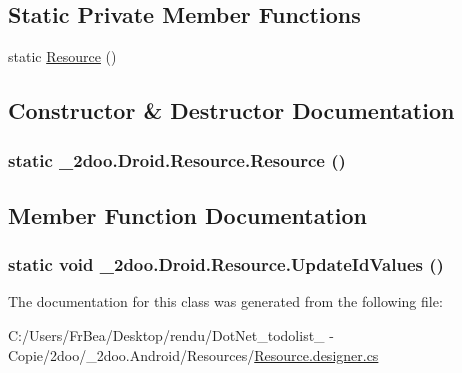 \subsection*{Static Private Member Functions}
\begin{CompactItemize}
\item 
static \hyperlink{class__2doo_1_1_droid_1_1_resource_0cb6fe7860d60e45dd6a4428438ed807}{Resource} ()
\end{CompactItemize}


\subsection{Constructor \& Destructor Documentation}
\hypertarget{class__2doo_1_1_droid_1_1_resource_0cb6fe7860d60e45dd6a4428438ed807}{
\subsubsection[{Resource}]{\setlength{\rightskip}{0pt plus 5cm}static \_\-2doo.Droid.Resource.Resource ()}}
\label{class__2doo_1_1_droid_1_1_resource_0cb6fe7860d60e45dd6a4428438ed807}




\subsection{Member Function Documentation}
\hypertarget{class__2doo_1_1_droid_1_1_resource_a98f33d59d19997d6c4bce90bf69b92d}{
\subsubsection[{UpdateIdValues}]{\setlength{\rightskip}{0pt plus 5cm}static void \_\-2doo.Droid.Resource.UpdateIdValues ()}}
\label{class__2doo_1_1_droid_1_1_resource_a98f33d59d19997d6c4bce90bf69b92d}




The documentation for this class was generated from the following file:\begin{CompactItemize}
\item 
C:/Users/FrBea/Desktop/rendu/DotNet\_\-todolist\_ - Copie/2doo/\_\-2doo.Android/Resources/\hyperlink{_resource_8designer_8cs}{Resource.designer.cs}\end{CompactItemize}
